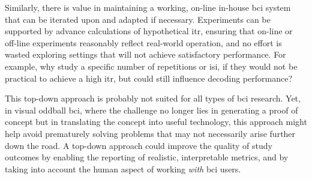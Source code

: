 Similarly, there is value in maintaining a working, on-line in-house \ac{bci}
system that can be iterated upon and adapted if necessary.
Experiments can be supported by advance calculations of hypothetical
\ac{itr}, ensuring that on-line or off-line experiments reasonably reflect
real-world operation, and no effort is wasted exploring settings that will not
achieve satisfactory performance.
For example, why study a specific number of repetitions or \ac{isi}, if they
would not be practical to achieve a high \ac{itr}, but could still influence
decoding performance?

This top-down approach is probably not suited for all types of \ac{bci}
research.
Yet, in visual oddball \ac{bci}, where the challenge no longer lies in generating
a proof of concept but in translating the concept into useful technology, this
approach might help avoid prematurely solving problems that may not necessarily
arise further down the road.
A top-down approach could improve the quality of study outcomes by enabling the
reporting of realistic, interpretable metrics,
and by taking into account the human aspect of working \emph{with} \ac{bci} users.

